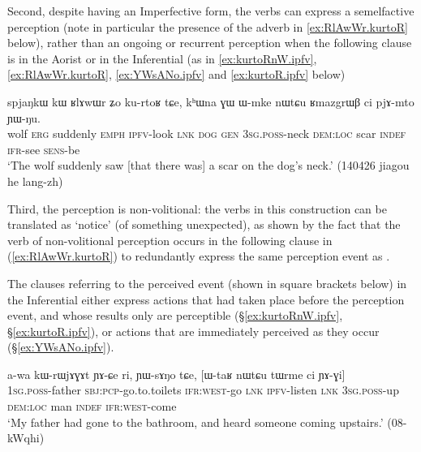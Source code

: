 Second, despite having an Imperfective form, the verbs can express a semelfactive perception (note in particular the presence of the adverb  in \ref{ex:RlAwWr.kurtoR} below), rather than an ongoing or recurrent perception when the following clause is in the Aorist or in the Inferential (as in \ref{ex:kurtoRnW.ipfv}, \ref{ex:RlAwWr.kurtoR}, \ref{ex:YWsANo.ipfv} and \ref{ex:kurtoR.ipfv} below)  

\begin{exe}
\ex \label{ex:RlAwWr.kurtoR}
\gll spjaŋkɯ kɯ ʁlɤwɯr ʑo ku-rtoʁ tɕe, kʰɯna ɣɯ ɯ-mke nɯtɕu ʁmazgrɯβ ci pjɤ-mto ɲɯ-ŋu.  \\
wolf \textsc{erg} suddenly \textsc{emph} \textsc{ipfv}-look \textsc{lnk} \textsc{dog} \textsc{gen} \textsc{3sg}.\textsc{poss}-neck \textsc{dem}:\textsc{loc} scar \textsc{indef} \textsc{ifr}-see \textsc{sens}-be \\
\glt `The wolf suddenly saw [that there was] a scar on the dog's neck.' (140426 jiagou he lang-zh)
\end{exe}

Third, the perception is non-volitional: the verbs in this construction can be translated as `notice' (of something unexpected), as shown by the fact that the verb of non-volitional perception  occurs in the following clause in (\ref{ex:RlAwWr.kurtoR}) to redundantly express the same perception event as . 

The clauses referring to the perceived event (shown in square brackets below) in the Inferential either express actions that had taken place before the perception event, and whose results only are perceptible (§\ref{ex:kurtoRnW.ipfv}, §\ref{ex:kurtoR.ipfv}), or actions that are immediately perceived as they occur (§\ref{ex:YWsANo.ipfv}).


\begin{exe}
\ex \label{ex:YWsANo.ipfv}
\gll a-wa kɯ-rɯjɤɣɤt ɲɤ-ɕe ri, ɲɯ-sɤŋo tɕe, [ɯ-taʁ nɯtɕu tɯrme ci ɲɤ-ɣi]  \\
\textsc{1sg}.\textsc{poss}-father \textsc{sbj}:\textsc{pcp}-go.to.toilets \textsc{ifr}:\textsc{west}-go \textsc{lnk} \textsc{ipfv}-listen \textsc{lnk} \textsc{3sg}.\textsc{poss}-up \textsc{dem}:\textsc{loc} man \textsc{indef} \textsc{ifr}:\textsc{west}-come \\
\glt `My father had gone to the bathroom, and heard someone coming upstairs.' (08-kWqhi)
\end{exe}

